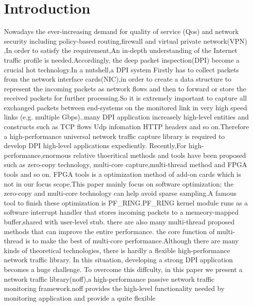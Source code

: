 \documentclass[conference]{IEEEtran}
\begin{document}
\section{Introduction}
Nowadays the ever-increasing demand for quality of service (Qos) and network
security including policy-based routing,firewall and virtual private network(VPN)
\cite{IEEE:1},In order to satisfy the requirement,An in-depth
understanding of the Internet traffic profile is needed.Accordingly, the deep packet inspection(DPI)
become a crucial hot technology\cite{IEEE:2}.In a nutshell,a DPI system Firstly has to collect packets
from the network interface cards(NIC),in order to create a data structure to represent the incoming packets
as network flows and then to forward or store the received packets for further processing.So it is extremely
important to capture all exchanged packets between end-systems on the monitored link in very high speed links
(e.g. multiple Gbps).\cite{IEEE:2}.many DPI application increasely high-level entities and constructs such as
TCP flows Udp infomation HTTP headers and so on.Therefore a high-performance universal network traffic capture
library is required to develop DPI high-level applications expediently.
\newline\indent Recently,For high-performance,enormous relative thoeritical methods and tools have been proposed such as
zero-copy technology, multi-core capture,multi-thread method and FPGA tools and so on. FPGA tools is a optimization 
method of add-on cards\cite{IEEE:3} which is not in our focus scope.This paper mainly focus on software optimization;
the zero-copy and multi-core technology can help avoid sparse sampling\cite{IEEE:4}.A famous tool to finish these optimization
is PF\_RING\cite{IEEE:5}.PF\_RING kernel module runs as a software interrupt handler that stores incoming packets to a memeory-mapped
buffer,shared with user-level stub. there are also many multi-thread proposed methods that can improve the entire performance.
the core function of multi-thread is to  make the best of multi-core performance.Although there are many kinds of theoretical
technologies, there is hardly a flexible high-performance network traffic library. In this situation, developing a strong DPI application
becomes a huge challenge.
\newline\indent To overcome this diffculty, in this paper we present a network traffic library(noff),a high-performance passive network
traffic monitoring framework.noff provides the high-level functionality needed by monitoring application and provide a quite flexible
\end{document}
